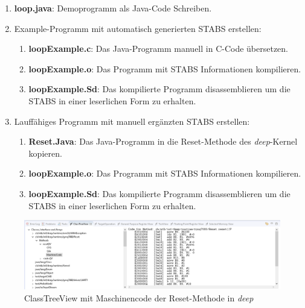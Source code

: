 \begin{enumerate}
	\item \textbf{loop.java}: Demoprogramm als Java-Code Schreiben.
	\item Example-Programm mit automatisch generierten STABS erstellen:
	\begin{enumerate}
		\item \textbf{loopExample.c}: Das Java-Programm manuell in C-Code übersetzen.
		\item \textbf{loopExample.o}: Das Programm mit STABS Informationen kompilieren.
		\item \textbf{loopExample.Sd}: Das kompilierte Programm disassemblieren um die STABS in einer leserlichen Form zu erhalten.
	\end{enumerate}
	\item Lauffähiges Programm mit manuell ergänzten STABS erstellen:
	\begin{enumerate}
		\item \textbf{Reset.Java}: Das Java-Programm in die Reset-Methode des \textit{deep}-Kernel kopieren.
		\item \textbf{loopExample.o}: Das Programm mit STABS Informationen kompilieren.
		\item \textbf{loopExample.Sd}: Das kompilierte Programm disassemblieren um die STABS in einer leserlichen Form zu erhalten.
	\end{enumerate}
\end{enumerate}


\begin{figure}[htbp]
	\centering
		\includegraphics[width=\textwidth,height=\textheight,keepaspectratio]{images/MaschineCode_ClassTreeView_Deep.PNG}
	\caption[]{ClassTreeView mit Maschinencode der Reset-Methode in \textit{deep}}
	\label{fig:MaschineCode_ClassTreeView_Deep}
\end{figure}